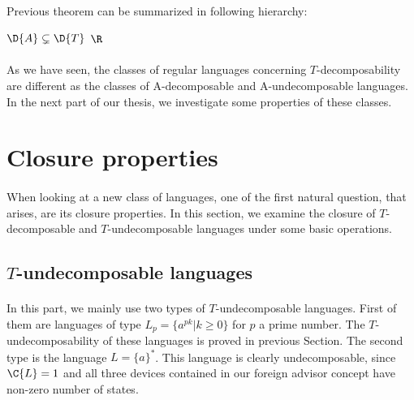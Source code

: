 \paragraph{}
Previous theorem can be summarized in following hierarchy: \\

\centerline{$\D{A} \subsetneq \D{T}$ $ \R$}

\paragraph{}
As we have seen, the classes of regular languages concerning $T$-decomposability are different as the classes of A-decomposable and A-undecomposable languages. In the next part of our thesis, we investigate some properties of these classes.

\section{Closure properties}

\paragraph{}
When looking at a new class of languages, one of the first natural question, that arises, are its closure properties. In this section, we examine the closure of $T$-decomposable and $T$-undecomposable languages under some basic operations.

\subsection{$T$-undecomposable languages}
\paragraph{}
In this part, we mainly use two types of $T$-undecomposable languages. First of them are languages of type $L_p = \{ a^{pk} | k \geq 0 \}$ for $p$ a prime number. The $T$-undecomposability of these languages is proved in previous Section. The second type is the language $L = \{ a \}^*$. This language is clearly undecomposable, since $\C{L} = 1$ and all three devices contained in our foreign advisor concept have non-zero number of states.


